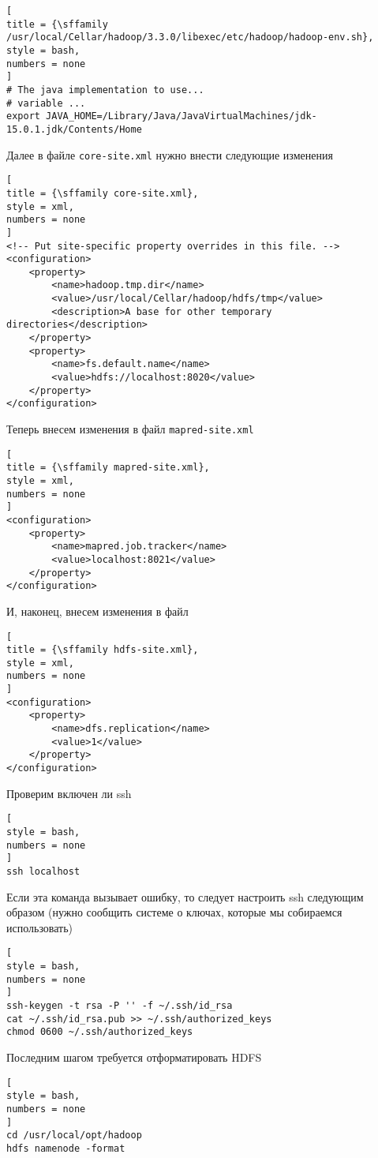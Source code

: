 \documentclass[%
	11pt,
	a4paper,
	utf8,
		]{article}
\begin{document}
\begin{lstlisting}[
title = {\sffamily /usr/local/Cellar/hadoop/3.3.0/libexec/etc/hadoop/hadoop-env.sh},
style = bash,
numbers = none	
]
# The java implementation to use...
# variable ...
export JAVA_HOME=/Library/Java/JavaVirtualMachines/jdk-15.0.1.jdk/Contents/Home
\end{lstlisting}

Далее в файле \texttt{core-site.xml} нужно внести следующие изменения
\begin{lstlisting}[
title = {\sffamily core-site.xml},
style = xml,
numbers = none	
]
<!-- Put site-specific property overrides in this file. -->
<configuration>
	<property>
		<name>hadoop.tmp.dir</name>
		<value>/usr/local/Cellar/hadoop/hdfs/tmp</value>
		<description>A base for other temporary directories</description>             
	</property>
	<property>
		<name>fs.default.name</name>
		<value>hdfs://localhost:8020</value>
	</property>
</configuration>
\end{lstlisting}

Теперь внесем изменения в файл \texttt{mapred-site.xml}
\begin{lstlisting}[
title = {\sffamily mapred-site.xml},
style = xml,
numbers = none	
]
<configuration>
	<property>
		<name>mapred.job.tracker</name>
		<value>localhost:8021</value>
	</property>
</configuration>
\end{lstlisting}

И, наконец, внесем изменения в файл 
\begin{lstlisting}[
title = {\sffamily hdfs-site.xml},
style = xml,
numbers = none	
]
<configuration>
	<property>
		<name>dfs.replication</name>
		<value>1</value>
	</property>
</configuration>
\end{lstlisting}

Проверим включен ли ssh
\begin{lstlisting}[
style = bash,
numbers = none	
]
ssh localhost
\end{lstlisting}

Если эта команда вызывает ошибку, то следует настроить ssh следующим образом (нужно сообщить системе о ключах, которые мы собираемся использовать)
\begin{lstlisting}[
style = bash,
numbers = none	
]
ssh-keygen -t rsa -P '' -f ~/.ssh/id_rsa
cat ~/.ssh/id_rsa.pub >> ~/.ssh/authorized_keys
chmod 0600 ~/.ssh/authorized_keys
\end{lstlisting}

Последним шагом требуется отформатировать HDFS
\begin{lstlisting}[
style = bash,
numbers = none	
]
cd /usr/local/opt/hadoop
hdfs namenode -format
\end{lstlisting}
\end{document}
